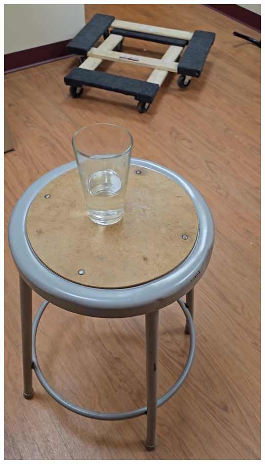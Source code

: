 \documentclass{article}
\begin{document}
\begin{center}
    \includegraphics[scale=0.02]{images/water2.jpg}

\end{center}
\end{document}
